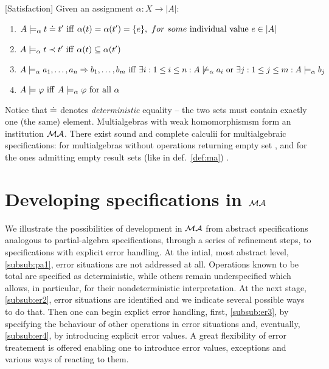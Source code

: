 \documentclass[10pt]{article}
\begin{document}
\begin{definition}\label{de:sat}
[Satisfaction] Given an assignment $\alpha:X\to|A|$:
\begin{enumerate}\MyLPar
\item $A \models_\alpha t \mathrel{\dot{=} }  t'\ {\rm iff\ } {\alpha}(t)
={\alpha}(t') = \{e\},\ {for\ some\ }{\rm individual\ value\ }e \in |A|$
\item $A \models_\alpha t \prec t'\ {\rm iff\ } {\alpha}(t) \subseteq {\alpha}(t')$
\item $ A \models_\alpha a_1, \ldots ,a_n \Rightarrow b_1, \ldots ,b_m\ {\rm iff\ }
\exists i: 1 \leq i \leq n : A \not\models_\alpha a_i\ {\rm or\ } \exists j: 1 \leq j \leq m : A \models_\alpha b_j$
\item $A \models \varphi\ {\rm iff\ } A \models_\alpha \varphi\ {\rm for\ all\ } \alpha$
\end{enumerate}
\end{definition}
Notice that $\mathrel{\dot{=} }$ denotes {\em deterministic} equality -- the two sets
must contain exactly one (the same) element.
%
Multialgebras with weak homomorphismsm form an institution
${\mathcal{MA}}$. 
There exist sound and complete calculii for
multialgebraic specifications: for multialgebras without operations returning
empty set \cite{toplas,calc}, and for the ones admitting empty result sets
(like in def.~\ref{def:ma}) \cite{BK}.



\section{Developing specifications in ${\mathcal{MA}}$}
\label{se:meth}
We illustrate the possibilities of development in ${\mathcal{MA}}$
from abstract specifications analogous to partial-algebra specifications,
through a series of refinement steps, to specifications with explicit error
handling. At the intial, most abstract level, \ref{subsub:pa1}, error situations are not
addressed at all. Operations known to be total are specified as
deterministic, while others remain underspecified which allows, in
particular, for their nondeterministic interpretation. At the next stage, \ref{subsub:er2},
error situations are identified and we indicate several possible ways to do
that. Then one can begin explict error handling, first, \ref{subsub:er3}, by specifying the
behaviour of other operations in error situations and, eventually,
\ref{subsub:er4}, by
introducing explicit error values. A great flexibility of error treatement is
offered enabling one to introduce error values, exceptions and various ways
of reacting to them.
\end{document}
